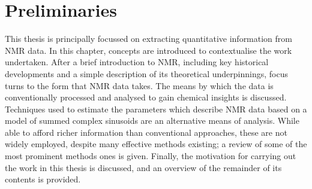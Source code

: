 \chapter{Preliminaries}
\label{chap:intro}
This thesis is principally focussed on extracting quantitative information
from \ac{NMR} data. In this chapter, concepts are introduced to
contextualise the work undertaken.
After a brief introduction to \ac{NMR}, including key historical developments
and a simple description of its theoretical underpinnings, focus turns to
the form that \ac{NMR} data takes. The means by which the data is
conventionally processed and analysed to gain chemical insights is discussed.
Techniques used to estimate the parameters which describe \ac{NMR} data based
on a model of summed complex sinusoids are an alternative means of analysis.
While able to afford richer information than conventional
approaches, these are not widely employed, despite many effective
methods existing; a review of some of the most prominent methods ones is
given. Finally, the motivation for carrying out the work in this thesis is
discussed, and an overview of the remainder of its contents is provided.




